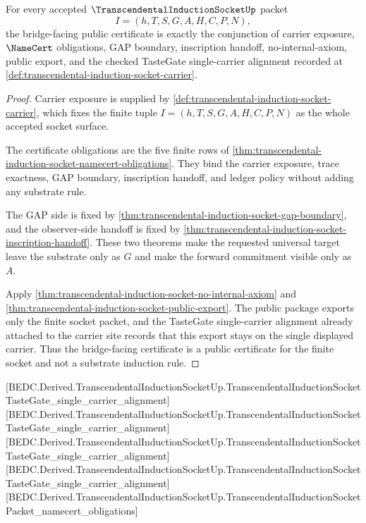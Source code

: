 \begin{theorem}
\label{thm:transcendental-induction-socket-bridge-facing-certificate}
For every accepted $\TranscendentalInductionSocketUp$ packet
$$
I=(h,T,S,G,A,H,C,P,N),
$$
the bridge-facing public certificate is exactly the conjunction of carrier exposure, $\NameCert$ obligations, GAP boundary, inscription handoff, no-internal-axiom, public export, and the checked TasteGate single-carrier alignment recorded at \autoref{def:transcendental-induction-socket-carrier}.
\end{theorem}
\begin{proof}
Carrier exposure is supplied by \autoref{def:transcendental-induction-socket-carrier}, which fixes the finite tuple $I=(h,T,S,G,A,H,C,P,N)$ as the whole accepted socket surface.

The certificate obligations are the five finite rows of \autoref{thm:transcendental-induction-socket-namecert-obligations}. They bind the carrier exposure, trace exactness, GAP boundary, inscription handoff, and ledger policy without adding any substrate rule.

The GAP side is fixed by \autoref{thm:transcendental-induction-socket-gap-boundary}, and the observer-side handoff is fixed by \autoref{thm:transcendental-induction-socket-inscription-handoff}. These two theorems make the requested universal target leave the substrate only as $G$ and make the forward commitment visible only as $A$.

Apply \autoref{thm:transcendental-induction-socket-no-internal-axiom} and \autoref{thm:transcendental-induction-socket-public-export}. The public package exports only the finite socket packet, and the TasteGate single-carrier alignment already attached to the carrier site records that this export stays on the single displayed carrier. Thus the bridge-facing certificate is a public certificate for the finite socket and not a substrate induction rule.
\end{proof}

[BEDC.Derived.TranscendentalInductionSocketUp.TranscendentalInductionSocketTasteGate\_single\_carrier\_alignment]
[BEDC.Derived.TranscendentalInductionSocketUp.TranscendentalInductionSocketTasteGate\_single\_carrier\_alignment]
[BEDC.Derived.TranscendentalInductionSocketUp.TranscendentalInductionSocketTasteGate\_single\_carrier\_alignment]
[BEDC.Derived.TranscendentalInductionSocketUp.TranscendentalInductionSocketTasteGate\_single\_carrier\_alignment]
[BEDC.Derived.TranscendentalInductionSocketUp.TranscendentalInductionSocketPacket\_namecert\_obligations]

